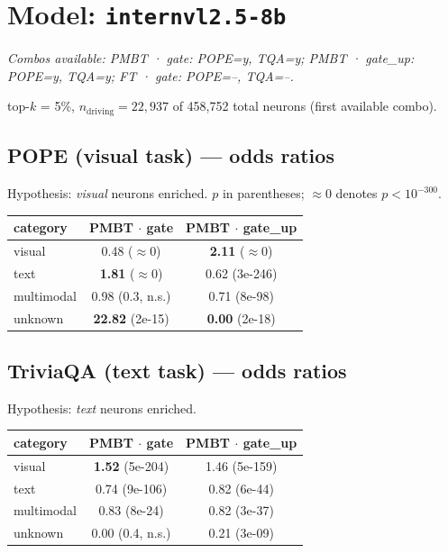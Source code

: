 \documentclass[11pt,a4paper]{article}
\begin{document}
\section{Model: \texttt{internvl2.5-8b}}
\emph{Combos available: PMBT · gate: POPE=y, TQA=y; PMBT · gate\_up: POPE=y, TQA=y; FT · gate: POPE=--, TQA=--.}

top-$k$ = 5\%, $n_{\text{driving}}=22,937$ of 458,752 total neurons (first available combo).

\subsection{POPE (visual task) --- odds ratios}
Hypothesis: \emph{visual} neurons enriched. $p$ in parentheses; $\approx$0 denotes $p<10^{-300}$.
\begin{center}
\begin{tabular}{lcc}
\toprule
category & PMBT $\cdot$ gate & PMBT $\cdot$ gate\_up \\
\midrule
visual & 0.48 ($\approx$0) & \textbf{2.11} ($\approx$0) \\
text & \textbf{1.81} ($\approx$0) & 0.62 (3e-246) \\
multimodal & 0.98 (0.3, n.s.) & 0.71 (8e-98) \\
unknown & \textbf{22.82} (2e-15) & \textbf{0.00} (2e-18) \\
\bottomrule
\end{tabular}
\end{center}
\subsection{TriviaQA (text task) --- odds ratios}
Hypothesis: \emph{text} neurons enriched.
\begin{center}
\begin{tabular}{lcc}
\toprule
category & PMBT $\cdot$ gate & PMBT $\cdot$ gate\_up \\
\midrule
visual & \textbf{1.52} (5e-204) & 1.46 (5e-159) \\
text & 0.74 (9e-106) & 0.82 (6e-44) \\
multimodal & 0.83 (8e-24) & 0.82 (3e-37) \\
unknown & 0.00 (0.4, n.s.) & 0.21 (3e-09) \\
\bottomrule
\end{tabular}
\end{center}
\end{document}
